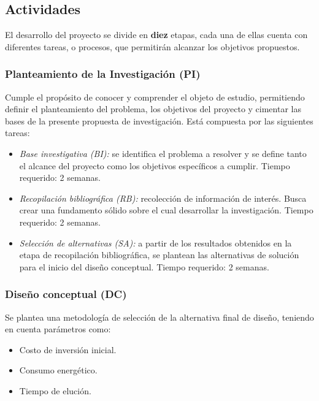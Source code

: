 \subsection{Actividades}

El desarrollo del proyecto se divide en \textbf{diez} etapas, cada una de ellas cuenta con diferentes tareas, o procesos, que permitir\'an alcanzar los objetivos propuestos.

\subsubsection{Planteamiento de la Investigaci\'on (PI)}

\noindent
\justify

Cumple el prop\'osito de conocer y comprender el objeto de estudio, permitiendo definir el planteamiento del problema, los objetivos del proyecto y cimentar las bases de la presente propuesta de investigaci\'on. Est\'a compuesta por las siguientes tareas:

\begin{itemize}
	\item \textit{Base investigativa (BI):} se identifica el problema a resolver y se define tanto el alcance del proyecto como los objetivos espec\'ificos a cumplir. Tiempo requerido: 2 semanas.
	\item \textit{Recopilaci\'on bibliogr\'afica (RB):} recolecci\'on de informaci\'on de inter\'es. Busca crear una fundamento s\'olido sobre el cual desarrollar la investigaci\'on. Tiempo requerido: 2 semanas.
	\item \textit{Selecci\'on de alternativas (SA):} a partir de los resultados obtenidos en la etapa de recopilaci\'on bibliogr\'afica, se plantean las alternativas de soluci\'on para el inicio del dise\~no conceptual. Tiempo requerido: 2 semanas.
\end{itemize}

\subsubsection{Dise\~no conceptual (DC)}

\noindent
\justify

Se plantea una metodolog\'ia de selecci\'on de la alternativa final de dise\~no, teniendo en cuenta par\'ametros como:

\begin{itemize}
	\item Costo de inversi\'on inicial.
	\item Consumo energ\'etico.
	\item Tiempo de eluci\'on.
\end{itemize}

